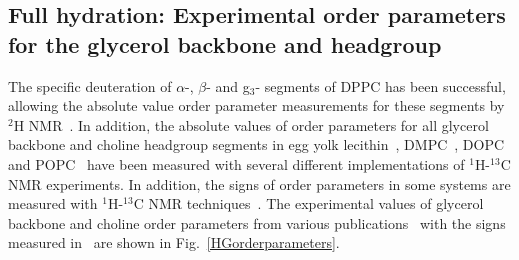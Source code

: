\documentclass[journal=jpcbfk,manuscript=article]{achemso}
\begin{document}
\subsection{Full hydration: Experimental order parameters for the glycerol backbone and headgroup}\label{experiments}
The specific deuteration of $\alpha$-, $\beta$- and g$_3$- segments of DPPC has been successful, 
allowing the absolute value order parameter measurements for these segments by $^2$H NMR~\cite{gally75,brown77,brown78,akutsu81}.
In addition, the absolute values of order parameters for all glycerol backbone and choline headgroup segments in egg yolk lecithin~\cite{hong95a},
DMPC~\cite{hong95b,gross97,dvinskikh05a}, DOPC~\cite{warschawski05} and POPC~\cite{warschawski05,ferreira13}
have been measured with several different implementations of $^1$H-$^{13}$C NMR experiments. In addition, the signs of order parameters in some systems
are measured with $^1$H-$^{13}$C NMR techniques~\cite{hong95a,hong95b,gross97}. The experimental values of glycerol backbone 
and choline order parameters from various publications~\cite{gally75,akutsu81,gross97,dvinskikh05a,ferreira13} with the signs measured in~\cite{hong95a,hong95b,gross97} are shown in Fig.~\ref{HGorderparameters}.
\end{document}
